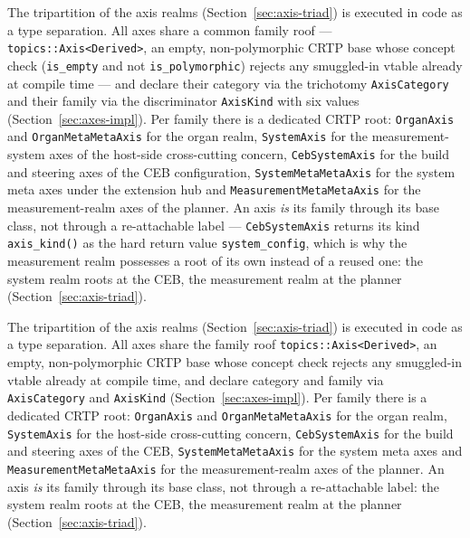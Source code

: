 \begin{nurlang}
The tripartition of the axis realms (Section~\ref{sec:axis-triad}) is executed in code as a type
separation. All axes share a common family roof --- \texttt{topics::Axis<Derived>}, an empty,
non-polymorphic CRTP base whose concept check (\texttt{is\_empty} and not \texttt{is\_polymorphic})
rejects any smuggled-in vtable already at compile time --- and declare their category via the
trichotomy \texttt{AxisCategory} and their family via the discriminator \texttt{AxisKind} with six
values (Section~\ref{sec:axes-impl}). Per family there is a dedicated CRTP root: \texttt{OrganAxis}
and \texttt{OrganMetaMetaAxis} for the organ realm, \texttt{SystemAxis} for the measurement-system
axes of the host-side cross-cutting concern, \texttt{CebSystemAxis} for the build and steering axes of
the CEB configuration, \texttt{SystemMetaMetaAxis} for the system meta axes under the extension hub and
\texttt{MeasurementMetaMetaAxis} for the measurement-realm axes of the planner. An axis \emph{is} its
family through its base class, not through a re-attachable label --- \texttt{CebSystemAxis} returns
its kind \texttt{axis\_kind()} as the hard return value \texttt{system\_config}, which is why the
measurement realm possesses a root of its own instead of a reused one: the system realm roots at the
CEB, the measurement realm at the planner (Section~\ref{sec:axis-triad}).
\end{nurlang}
\begin{nurkurz}
The tripartition of the axis realms (Section~\ref{sec:axis-triad}) is executed in code as a type
separation. All axes share the family roof \texttt{topics::Axis<Derived>}, an empty, non-polymorphic
CRTP base whose concept check rejects any smuggled-in vtable already at compile time, and declare
category and family via \texttt{AxisCategory} and \texttt{AxisKind} (Section~\ref{sec:axes-impl}). Per
family there is a dedicated CRTP root: \texttt{OrganAxis} and \texttt{OrganMetaMetaAxis} for the organ
realm, \texttt{SystemAxis} for the host-side cross-cutting concern, \texttt{CebSystemAxis} for the
build and steering axes of the CEB, \texttt{SystemMetaMetaAxis} for the system meta axes and
\texttt{MeasurementMetaMetaAxis} for the measurement-realm axes of the planner. An axis \emph{is} its
family through its base class, not through a re-attachable label: the system realm roots at the CEB,
the measurement realm at the planner (Section~\ref{sec:axis-triad}).
\end{nurkurz}

